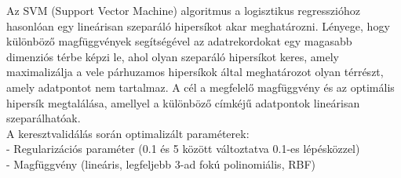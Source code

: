 \documentclass[12pt]{article}
\begin{document}
Az SVM (Support Vector Machine) algoritmus a logisztikus regresszióhoz hasonlóan egy lineárisan szeparáló hipersíkot akar meghatározni\cite{svm}. Lényege, hogy különböző magfüggvények segítségével az adatrekordokat egy magasabb dimenziós térbe képzi le, ahol olyan szeparáló hipersíkot keres, amely maximalizálja a vele párhuzamos hipersíkok által meghatározot olyan térrészt, amely adatpontot nem tartalmaz. A cél a megfelelő magfüggvény és az optimális hipersík megtalálása, amellyel a különböző címkéjű adatpontok lineárisan szeparálhatóak. \\

\noindent A keresztvalidálás során optimalizált paraméterek: \\
- Regularizációs paraméter (0.1 és 5 között változtatva 0.1-es lépésközzel)\\
- Magfüggvény (lineáris, legfeljebb 3-ad fokú polinomiális, RBF)



%
%
%
\end{document}
